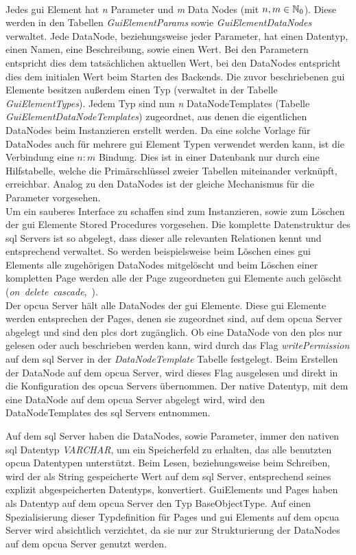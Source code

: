 \\Jedes \ac{gui} Element hat \emph{n} Parameter und \emph{m} Data Nodes (mit $ n, m \in \mathbb{N}_0 $). 
Diese werden in den Tabellen \emph{GuiElementParams} sowie \emph{GuiElementDataNodes} verwaltet.
Jede DataNode, beziehungsweise jeder Parameter, hat einen Datentyp, einen Namen, eine Beschreibung, sowie einen Wert. 
Bei den Parametern entspricht dies dem tatsächlichen aktuellen Wert, 
bei den DataNodes entspricht dies dem initialen Wert beim Starten des Backends.
Die zuvor beschriebenen \ac{gui} Elemente besitzen außerdem einen Typ (verwaltet in der Tabelle \emph{GuiElementTypes}).
Jedem Typ sind nun \emph{n} DataNodeTemplates (Tabelle \emph{GuiElementDataNodeTemplates}) zugeordnet, 
aus denen die eigentlichen DataNodes beim Instanzieren erstellt werden. Da eine solche Vorlage für DataNodes auch für mehrere \ac{gui} Element Typen verwendet werden kann, 
ist die Verbindung eine $n:m$ Bindung. 
Dies ist in einer Datenbank nur durch eine Hilfstabelle, 
welche die Primärschlüssel zweier Tabellen miteinander verknüpft, erreichbar. 
Analog zu den DataNodes ist der gleiche Mechanismus für die Parameter vorgesehen.
\\Um ein sauberes Interface zu schaffen sind zum Instanzieren, 
sowie zum Löschen der \ac{gui} Elemente Stored Procedures vorgesehen.
Die komplette Datenstruktur des \ac{sql} Servers ist so abgelegt, 
dass dieser alle relevanten Relationen kennt und entsprechend verwaltet.
So werden beispielsweise beim Löschen eines \ac{gui} Elements alle zugehörigen DataNodes mitgelöscht und 
beim Löschen einer kompletten Page werden alle der Page zugeordneten \ac{gui} Elemente auch gelöscht 
\mbox{(\emph{on delete cascade}, )}.\\ 
Der \ac{opcua} Server hält alle DataNodes der \ac{gui} Elemente. 
Diese \ac{gui} Elemente werden entsprechen der Pages, denen sie zugeordnet sind, auf dem \ac{opcua} Server abgelegt und 
sind den \acp{plc} dort zugänglich.
Ob eine DataNode von den \acp{plc} nur gelesen oder auch beschrieben werden kann, 
wird durch das Flag \emph{writePermission} auf dem \ac{sql} Server in der \emph{DataNodeTemplate} Tabelle festgelegt. 
Beim Erstellen der DataNode auf dem \ac{opcua} Server, wird dieses Flag ausgelesen und 
direkt in die Konfiguration des \ac{opcua} Servers übernommen.
Der native Datentyp, mit dem eine DataNode auf dem \ac{opcua} Server abgelegt wird, wird den DataNodeTemplates des \ac{sql} Servers entnommen.

Auf dem \ac{sql} Server haben die DataNodes, sowie Parameter, immer den nativen \ac{sql} Datentyp \emph{VARCHAR}, um ein Speicherfeld zu erhalten, das alle benutzten \ac{opcua} Datentypen unterstützt.
Beim Lesen, beziehungsweise beim Schreiben, wird der als String gespeicherte Wert auf dem \ac{sql} Server, 
entsprechend seines explizit abgespeicherten Datentyps, konvertiert. 
GuiElements und Pages haben als Datentyp auf dem \ac{opcua} Server den Typ BaseObjectType.
Auf einen Spezialisierung dieser Typdefinition für Pages und \ac{gui} Elements auf dem \ac{opcua} Server wird absichtlich verzichtet, 
da sie nur zur Strukturierung der DataNodes auf dem \ac{opcua} Server genutzt werden.


